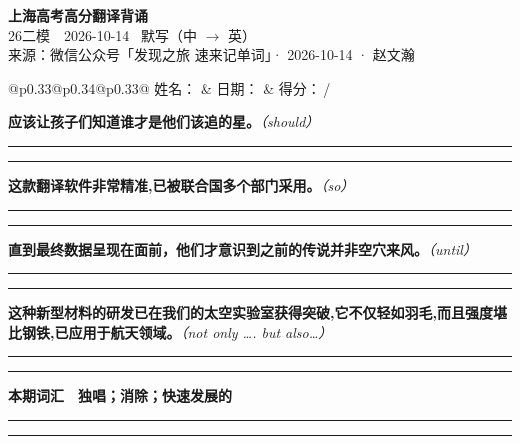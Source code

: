 \documentclass[11pt,a4paper]{article}
\newcommand{\num}[1]{\makebox[1.9em][r]{#1.}\hspace{0.3em}}
\newcommand{\wline}{\noindent\rule{\linewidth}{0.4pt}}
\newcommand{\prompt}[1]{\emph{\textcolor{tipblue}{\small（#1）}}}
\begin{document}
\pagestyle{plain}
\begin{center}
{\LARGE\bfseries 上海高考高分翻译背诵 }\\[0.25em]
{\large 26二模　2026-10-14 \quad\ 默写（中 $\to$ 英）}\\[0.35em]
{\footnotesize 来源：微信公众号「发现之旅 速来记单词」· 2026-10-14 · 赵文瀚}
\end{center}

\vspace{0.4em}
\noindent\begin{tabular}{@{}p{0.33\textwidth}@{}p{0.34\textwidth}@{}p{0.33\textwidth}@{}}
姓名：\underline{\hspace{2.0cm}} & 日期：\underline{\hspace{2.0cm}} & 得分：\underline{\hspace{1.4cm}}\,/ \\
\end{tabular}

\vspace{0.5em}

\vspace{0.8em}
\num{1}\textbf{应该让孩子们知道谁才是他们该追的星。}\prompt{should}

\vspace{0.3em}

\wline\vspace{0.3em}
\wline

\num{2}\textbf{这款翻译软件非常精准,已被联合国多个部门采用。}\prompt{so}

\vspace{0.3em}

\wline\vspace{0.3em}
\wline

\num{3}\textbf{直到最终数据呈现在面前，他们才意识到之前的传说并非空穴来风。}\prompt{until}

\vspace{0.3em}

\wline\vspace{0.3em}
\wline

\num{4}\textbf{这种新型材料的研发已在我们的太空实验室获得突破,它不仅轻如羽毛,而且强度堪比钢铁,已应用于航天领域。}\prompt{not only …. but also…}

\vspace{0.3em}

\wline\vspace{0.3em}
\wline

\vspace{0.4em}\noindent{\color{rulegray}\rule{\textwidth}{0.6pt}}\vspace{0.4em}

\num{5}\textbf{本期词汇　独唱；消除；快速发展的}

\vspace{0.3em}

\wline\vspace{0.3em}
\wline
\end{document}
